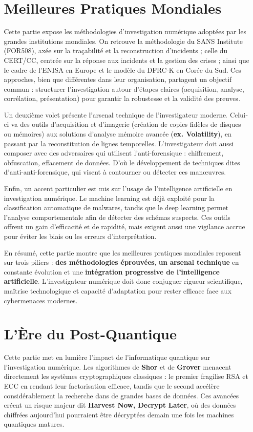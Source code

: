 \documentclass[memoire, 12pt]{report}
\begin{document}
\section*{Meilleures Pratiques Mondiales}
Cette partie expose les méthodologies d’investigation numérique adoptées par les grandes institutions mondiales. On retrouve la méthodologie du SANS Institute (FOR508), axée sur la traçabilité et la reconstruction d’incidents ; celle du CERT/CC, centrée sur la réponse aux incidents et la gestion des crises ; ainsi que le cadre de l’ENISA en Europe et le modèle du DFRC-K en Corée du Sud. Ces approches, bien que différentes dans leur organisation, partagent un objectif commun : structurer l’investigation autour d’étapes claires (acquisition, analyse, corrélation, présentation) pour garantir la robustesse et la validité des preuves.

Un deuxième volet présente l’arsenal technique de l’investigateur moderne. Celui-ci va des outils d’acquisition et d’imagerie (création de copies fidèles de disques ou mémoires) aux solutions d’analyse mémoire avancée (\textbf{ex. Volatility}), en passant par la reconstitution de lignes temporelles. L’investigateur doit aussi composer avec des adversaires qui utilisent l’anti-forensique : chiffrement, obfuscation, effacement de données. D’où le développement de techniques dites d’anti-anti-forensique, qui visent à contourner ou détecter ces manœuvres.

Enfin, un accent particulier est mis sur l’usage de l’intelligence artificielle en investigation numérique. Le machine learning est déjà exploité pour la classification automatique de malwares, tandis que le deep learning permet l’analyse comportementale afin de détecter des schémas suspects. Ces outils offrent un gain d’efficacité et de rapidité, mais exigent aussi une vigilance accrue pour éviter les biais ou les erreurs d’interprétation.

En résumé, cette partie montre que les meilleures pratiques mondiales reposent sur trois piliers : \textbf{des méthodologies éprouvées}, \textbf{un arsenal technique} en constante évolution et une \textbf{intégration progressive de l’intelligence artificielle}. L’investigateur numérique doit donc conjuguer rigueur scientifique, maîtrise technologique et capacité d’adaptation pour rester efficace face aux cybermenaces modernes.



\section*{L’Ère du Post-Quantique}
Cette partie met en lumière l’impact de l’informatique quantique sur l’investigation numérique. Les algorithmes de \textbf{Shor} et de \textbf{Grover} menacent directement les systèmes cryptographiques classiques : le premier fragilise RSA et ECC en rendant leur factorisation efficace, tandis que le second accélère considérablement la recherche dans de grandes bases de données. Ces avancées créent un risque majeur dit \textbf{Harvest Now, Decrypt Later}, où des données chiffrées aujourd’hui pourraient être décryptées demain une fois les machines quantiques matures.
\end{document}
